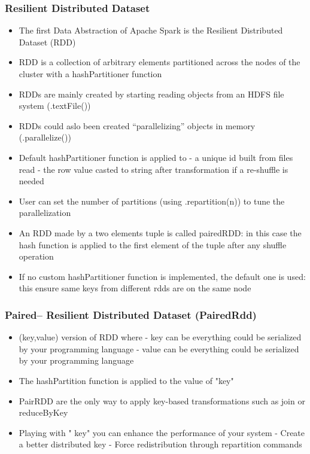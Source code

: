 \subsubsection{Resilient Distributed Dataset}
\begin{itemize}
	\item The first Data Abstraction of Apache Spark is the Resilient Distributed Dataset (RDD)
	\item RDD is a collection of arbitrary elements partitioned across the nodes of the cluster with a hashPartitioner function
	\item RDDs are mainly created by starting reading objects from an HDFS file system (.textFile())
	\item RDDs could aslo been created “parallelizing” objects in memory (.parallelize())
	\item Default hashPartitioner function is applied to
	- a unique id built from files read
	- the row value casted to string after transformation if a re-shuffle is needed
	\item User can set the number of partitions (using .repartition(n)) to tune the parallelization
	\item An RDD made by a two elements tuple is called pairedRDD: in this case the hash function is applied to the first element of the tuple after any shuffle operation 
	\item If no custom hashPartitioner function is implemented, the default one is used: this  ensure same keys from different rdds are on the same node
\end{itemize}

\subsubsection{Paired– Resilient Distributed Dataset (PairedRdd)}

\begin{itemize}
	\item (key,value) version of RDD where
	- key can be everything could be serialized by your programming language
	- value can be everything could be serialized by your programming language
	\item The hashPartition function is applied to the value of "key"
	\item PairRDD are the only way to apply key-based transformations such as join or reduceByKey
	\item Playing with " key" you can enhance the performance of your system
	- Create a better distributed key
	- Force redistribution through repartition commands
\end{itemize}

